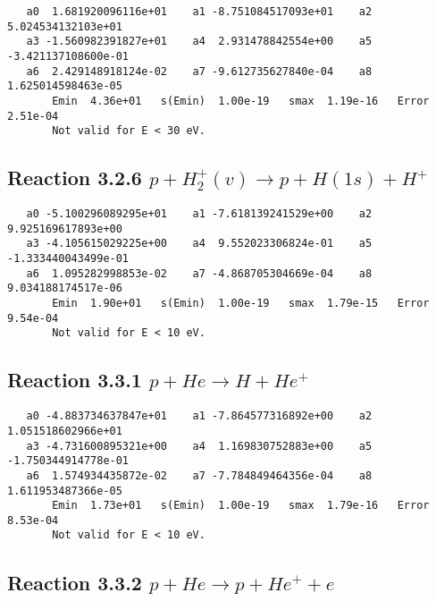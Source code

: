 \documentclass[12pt]{article}
\begin{document}
\begin{small}\begin{verbatim}
   a0  1.681920096116e+01    a1 -8.751084517093e+01    a2  5.024534132103e+01
   a3 -1.560982391827e+01    a4  2.931478842554e+00    a5 -3.421137108600e-01
   a6  2.429148918124e-02    a7 -9.612735627840e-04    a8  1.625014598463e-05
       Emin  4.36e+01   s(Emin)  1.00e-19   smax  1.19e-16   Error  2.51e-04
       Not valid for E < 30 eV.
\end{verbatim}\end{small}



                              



\newpage
\subsection{Reaction 3.2.6 $   p + H_2^+(v) \rightarrow p + H(1s) + H^+$}


\begin{small}\begin{verbatim}
   a0 -5.100296089295e+01    a1 -7.618139241529e+00    a2  9.925169617893e+00
   a3 -4.105615029225e+00    a4  9.552023306824e-01    a5 -1.333440043499e-01
   a6  1.095282998853e-02    a7 -4.868705304669e-04    a8  9.034188174517e-06
       Emin  1.90e+01   s(Emin)  1.00e-19   smax  1.79e-15   Error  9.54e-04
       Not valid for E < 10 eV.
\end{verbatim}\end{small}

\newpage
\subsection{
Reaction 3.3.1 $   p + He \rightarrow  H + He^+$}


\begin{small}\begin{verbatim}
   a0 -4.883734637847e+01    a1 -7.864577316892e+00    a2  1.051518602966e+01
   a3 -4.731600895321e+00    a4  1.169830752883e+00    a5 -1.750344914778e-01
   a6  1.574934435872e-02    a7 -7.784849464356e-04    a8  1.611953487366e-05
       Emin  1.73e+01   s(Emin)  1.00e-19   smax  1.79e-16   Error  8.53e-04
       Not valid for E < 10 eV.
\end{verbatim}\end{small}


\newpage
\subsection{Reaction 3.3.2 $    p + He \rightarrow p + He^+ + e$}
\end{document}
